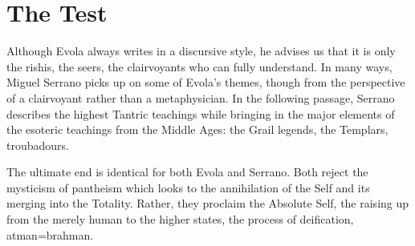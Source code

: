 \section{The Test}\label{sec:TheTest}

Although Evola always writes in a discursive style, he advises us that it is only the rishis, the seers, the clairvoyants who can fully understand. In many ways, Miguel Serrano picks up on some of Evola's themes, though from the perspective of a clairvoyant rather than a metaphysician. In the following passage, Serrano describes the highest Tantric teachings while bringing in the major elements of the esoteric teachings from the Middle Ages: the Grail legends, the Templars, troubadours.

The ultimate end is identical for both Evola and Serrano. Both reject the mysticism of pantheism which looks to the annihilation of the Self and its merging into the Totality. Rather, they proclaim the Absolute Self, the raising up from the merely human to the higher states, the process of deification, atman=brahman.

